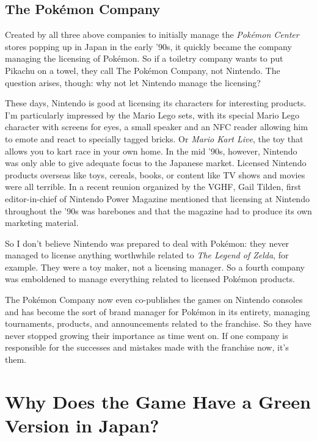 \documentclass{book}
\begin{document}
\subsection*{The Pokémon Company}\nopagebreak[4]

Created by all three above companies to initially manage the \emph{Pokémon Center} stores popping up in Japan in the early ’90s, it quickly became the company managing the licensing of Pokémon. So if a toiletry company wants to put Pikachu on a towel, they call The Pokémon Company, not Nintendo. The question arises, though: why not let Nintendo manage the licensing?

These days, Nintendo is good at licensing its characters for interesting products. I’m particularly impressed by the Mario Lego sets, with its special Mario Lego character with screens for eyes, a small speaker and an NFC reader allowing him to emote and react to specially tagged bricks. Or \emph{Mario Kart Live}, the toy that allows you to kart race in your own home. In the mid ’90s, however, Nintendo was only able to give adequate focus to the Japanese market. Licensed Nintendo products overseas like toys, cereals, books, or content like TV shows and movies were all terrible. In a recent reunion organized by the VGHF, Gail Tilden, first editor-in-chief of Nintendo Power Magazine mentioned that licensing at Nintendo throughout the ’90s was barebones and that the magazine had to produce its own marketing material.

So I don’t believe Nintendo was prepared to deal with Pokémon: they never managed to license anything worthwhile related to \emph{The Legend of Zelda}, for example. They were a toy maker, not a licensing manager. So a fourth company was emboldened to manage everything related to licensed Pokémon products.

The Pokémon Company now even co-publishes the games on Nintendo consoles and has become the sort of brand manager for Pokémon in its entirety, managing tournaments, products, and announcements related to the franchise. So they have never stopped growing their importance as time went on. If one company is responsible for the successes and mistakes made with the franchise now, it’s them.

\FloatBarrier\needspace{10mm}\section*{Why Does the Game Have a Green Version in Japan?}\nopagebreak[4]
\end{document}
